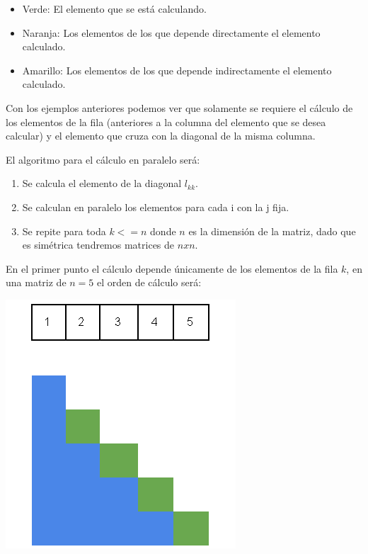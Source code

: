 \documentclass[10pt, oneside,spanish]{article}
\begin{document}
\begin{itemize}
\item Verde: El elemento que se está calculando.
\end{itemize}

\begin{itemize}
\item Naranja: Los elementos de los que depende directamente el elemento calculado.
\end{itemize}

\begin{itemize}
\item Amarillo: Los elementos de los que depende indirectamente el elemento calculado.
\end{itemize}


Con los ejemplos anteriores podemos ver que solamente se requiere el cálculo de los elementos de la fila (anteriores a la columna del elemento que se desea calcular) y el elemento que cruza con la diagonal de la misma columna.

El algoritmo para el cálculo en paralelo será:

\begin{enumerate}
\item Se calcula el elemento de la diagonal  $l_{kk}$.
\item Se calculan en paralelo los elementos para cada i con la j fija.
\item Se repite para toda $k <=n$ donde $n$ es la dimensión de la matriz, dado que es simétrica tendremos matrices de $nxn$.
\end{enumerate}

En el primer punto el cálculo depende únicamente de los elementos de la fila $k$, en una matriz de $n=5$ el orden de cálculo será:

\begin{center}
	\includegraphics{MatrixBlue}
\end{center}
\end{document}
